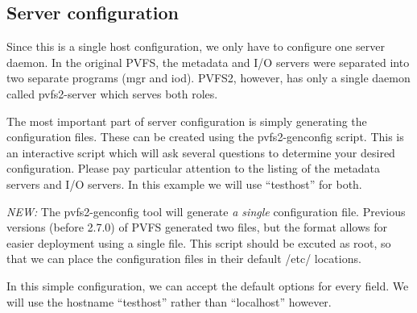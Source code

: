 \documentclass[11pt, letterpaper]{article}
\begin{document}
\subsection{Server configuration}

Since this is a single host configuration, we only have to configure
one server daemon.  In the original PVFS, the metadata and I/O servers
were separated into two separate programs (mgr and iod).  PVFS2,
however, has only a single daemon called pvfs2-server which serves
both roles.

The most important part of server configuration is simply generating
the configuration files.  These can be created using the
pvfs2-genconfig script.  This is an interactive script which will ask
several questions to determine your desired configuration.  Please pay
particular attention to the listing of the metadata servers and I/O
servers.  In this example we will use ``testhost'' for both.

\emph{NEW:} The pvfs2-genconfig tool will generate 
\emph{a single} configuration file.  Previous versions (before 2.7.0) of PVFS
generated two files, but the format allows for easier deployment
using a single file.  This script should be excuted as root, so
that we can place the configuration files in their default /etc/
locations.

In this simple configuration, we can accept the default options for
every field.  We will use the hostname ``testhost'' rather than
``localhost'' however.
\end{document}
